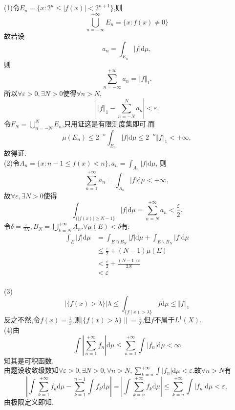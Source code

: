 \documentclass[]{article}
\begin{document}
\section{}
\noindent(1)令$E_n=\{x:2^n\leq |f(x)|<2^{n+1}\}$,则$$\bigcup_{n=-\infty}^{+\infty}E_n=\{x:f(x)\neq0\}$$
故若设$$a_n=\int_{E_n}|f|\mathrm{d}\mu,$$则$$\sum_{n=-\infty}^{+\infty}a_n=\Vert f\Vert_1.$$所以$\forall\varepsilon>0,\exists N>0$使得$\forall n>N$,$$|\Vert f\Vert_1-\sum_{n=-N}^{N}a_n|<\varepsilon.$$令$F_N=\bigcup_{n=-N}^{N}E_n$,只用证这是有限测度集即可.而$$\mu(E_n)\leq2^{-n}\int_{E_n}|f|\mathrm{d}\mu\leq2^{-n}\Vert f\Vert_1<+\infty,$$故得证.\\
(2)令$A_n=\{x:n-1\leq f(x)<n\},a_n=\int_{A_n}|f|\mathrm{d}\mu$,
则$$\sum_{n=1}^{+\infty}a_n=\int_{A_n}|f|\mathrm{d}\mu<+\infty,$$
故$\forall\varepsilon,\exists N>0$使得$$\int_{\{|f(x)|\geq N-1\}}|f|\mathrm{d}\mu=\sum_{n=N}^{+\infty}a_n<\frac{\varepsilon}{2}.$$令$\delta=\frac{\varepsilon}{2N},B_N=\bigcup_{k=N}^{+\infty}A_n.\forall \mu(E)<\delta$有:
\begin{equation}
	\begin{aligned}	\int_{E}|f|\mathrm{d}\mu&=\int_{E\cap B_N}|f|\mathrm{d}\mu+\int_{E\backslash B_N}|f|\mathrm{d}\mu\\&\leq\frac{\varepsilon}{2}+(N-1)\mu(E)\\&<
		\frac{\varepsilon}{2}+\frac{(N-1)\varepsilon}{2N}\\&<\varepsilon
	\end{aligned}
\end{equation}
\\
(3)$$|\{f(x)>\lambda\}|\lambda\leq\int_{\{f(x)>\lambda\}}f\mathrm{d}\mu\leq\Vert f\Vert_1$$反之不然,令$f(x)=\frac{1}{x}$,则$|\{f(x)>\lambda\}\|=\frac{1}{\lambda}$,但$f$不属于$L^1(X)$.\\
(4)由$$\int|\sum_{n=1}^{+\infty}f_n|\mathrm{d}\mu\leq\sum_{n=1}^{+\infty}\int|f_n|\mathrm{d}\mu<\infty$$知其是可积函数.\\
由题设收敛级数知$\forall\varepsilon>0,\exists N>0,\forall n>N,\sum_{k=n}^{+\infty}\int|f_n|\mathrm{d}\mu<\varepsilon.$故$\forall n>N$有$$|\int\sum_{k=1}^{+\infty}f_k\mathrm{d}\mu-\sum_{k=1}^{n-1}\int f_k\mathrm{d}\mu|=|\int\sum_{k=n}^{+\infty}f_k\mathrm{d}\mu|\leq\sum_{k=n}^{+\infty}\int|f_n|\mathrm{d}\mu<\varepsilon,$$由极限定义即知.
\section{}
\end{document}
